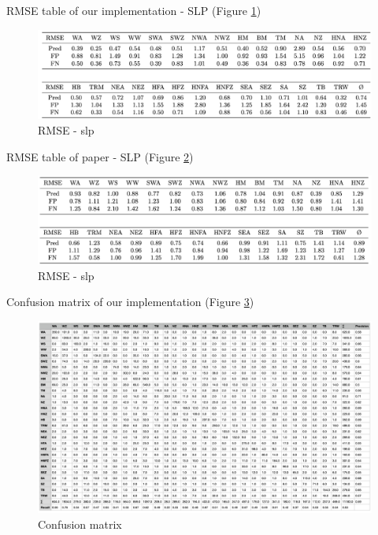 \documentclass[
]{krantz}
\begin{document}
RMSE table of our implementation - SLP (Figure \ref{fig:rmse})

\begin{figure}

{\centering \includegraphics[width=0.7\linewidth]{work/01-weatherpattern/figures/rmse} 

}

\caption{RMSE - slp}\label{fig:rmse}
\end{figure}

RMSE table of paper - SLP (Figure \ref{fig:rmsepaper})

\begin{figure}

{\centering \includegraphics[width=0.7\linewidth]{work/01-weatherpattern/figures/paper/rmse} 

}

\caption{RMSE - slp}\label{fig:rmsepaper}
\end{figure}

Confusion matrix of our implementation (Figure \ref{fig:conf})

\begin{figure}

{\centering \includegraphics[width=0.7\linewidth]{work/01-weatherpattern/figures/confusion} 

}

\caption{Confusion matrix}\label{fig:conf}
\end{figure}
\end{document}
